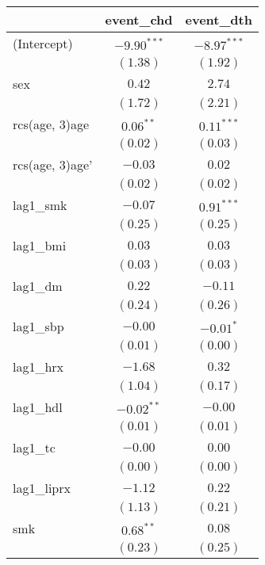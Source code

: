 
\begin{tabular}{l c c}
\toprule
 & event_chd & event_dth \\
\midrule
(Intercept)           & $-9.90^{***}$ & $-8.97^{***}$ \\
                      & $(1.38)$      & $(1.92)$      \\
sex                   & $0.42$        & $2.74$        \\
                      & $(1.72)$      & $(2.21)$      \\
rcs(age, 3)age        & $0.06^{**}$   & $0.11^{***}$  \\
                      & $(0.02)$      & $(0.03)$      \\
rcs(age, 3)age'       & $-0.03$       & $0.02$        \\
                      & $(0.02)$      & $(0.02)$      \\
lag1\_smk             & $-0.07$       & $0.91^{***}$  \\
                      & $(0.25)$      & $(0.25)$      \\
lag1\_bmi             & $0.03$        & $0.03$        \\
                      & $(0.03)$      & $(0.03)$      \\
lag1\_dm              & $0.22$        & $-0.11$       \\
                      & $(0.24)$      & $(0.26)$      \\
lag1\_sbp             & $-0.00$       & $-0.01^{*}$   \\
                      & $(0.01)$      & $(0.00)$      \\
lag1\_hrx             & $-1.68$       & $0.32$        \\
                      & $(1.04)$      & $(0.17)$      \\
lag1\_hdl             & $-0.02^{**}$  & $-0.00$       \\
                      & $(0.01)$      & $(0.01)$      \\
lag1\_tc              & $-0.00$       & $0.00$        \\
                      & $(0.00)$      & $(0.00)$      \\
lag1\_liprx           & $-1.12$       & $0.22$        \\
                      & $(1.13)$      & $(0.21)$      \\
smk                   & $0.68^{**}$   & $0.08$        \\
                      & $(0.23)$      & $(0.25)$      \\

\end{tabular}

